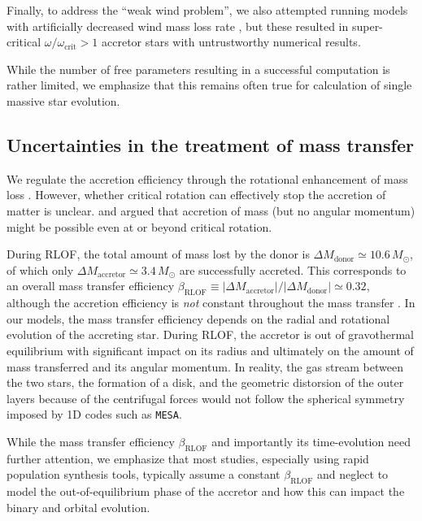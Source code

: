 \documentclass[twocolumn,twocolappendix,trackchanges]{aastex63}
\begin{document}
Finally, to address the ``weak wind problem'', we also attempted
running models with artificially decreased wind mass loss rate
\citep[e.g.,][]{renzo:17}, but these resulted in super-critical
$\omega/\omega_\mathrm{crit}>1$ accretor stars with untrustworthy
numerical results.

While the number of free parameters resulting in a successful
computation is rather limited, we emphasize that this remains often
true for calculation of single massive star evolution.

\subsection{Uncertainties in the treatment of mass transfer}
\label{sec:bin_param}

We regulate the accretion efficiency through the rotational
enhancement of mass loss \citep[e.g.,][]{langer:98}.
However, whether critical rotation can effectively stop the accretion
of matter is unclear. \cite{popham:91} and \cite{paczynski:91}
argued that accretion of mass (but no angular momentum) might be
possible even at or beyond critical rotation.

During RLOF, the total amount of mass lost by the donor is
$\Delta M_\mathrm{donor} \simeq 10.6\,M_\odot$, of which only
$\Delta M_\mathrm{accretor}\simeq 3.4\,M_\odot$ are successfully
accreted. This corresponds to an overall mass transfer efficiency
$\beta_\mathrm{RLOF}\equiv |\Delta M_\mathrm{accretor}|/|\Delta M_\mathrm{donor}| \simeq 0.32$,
although the accretion efficiency is \emph{not} constant throughout
the mass transfer \citep[e.g.,][]{vanrensbergen:06}. In our models,
the mass transfer efficiency depends on the radial and rotational
evolution of the accreting star. During RLOF, the accretor is out of
gravothermal equilibrium with significant impact on its radius and
ultimately on the amount of mass transferred and its angular
momentum. In reality, the gas stream between the two stars, the
formation of a disk, and the geometric distorsion of the outer layers because
of the centrifugal forces would not follow the spherical symmetry
imposed by 1D codes such as \texttt{MESA}.

While the mass transfer efficiency $\beta_\mathrm{RLOF}$ and
importantly its time-evolution need further attention, we emphasize that most studies, especially
using rapid population synthesis tools, typically assume a
constant $\beta_\mathrm{RLOF}$ and neglect to model the
out-of-equilibrium phase of the accretor and how this can impact the
binary and orbital evolution.
\end{document}
